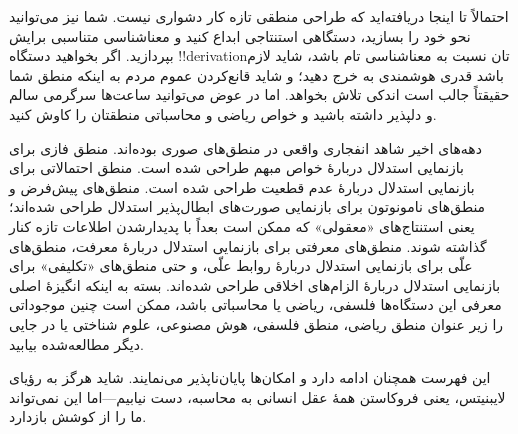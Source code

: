 \documentclass[../../../include/open-logic-section]{subfiles}
\begin{document}


احتمالاً تا اینجا دریافته‌اید که طراحی منطقی تازه کار دشواری نیست.
شما نیز می‌توانید نحو خود را بسازید، دستگاهی استنتاجی ابداع کنید و
معناشناسی متناسبی برایش بپردازید. اگر بخواهید دستگاه !!{derivation}تان
نسبت به معناشناسی تام باشد، شاید لازم باشد قدری هوشمندی به خرج دهید؛ و
شاید قانع‌کردن عموم مردم به اینکه منطق شما حقیقتاً جالب است اندکی تلاش
بخواهد. اما در عوض می‌توانید ساعت‌ها سرگرمی سالم و دلپذیر داشته باشید
و خواص ریاضی و محاسباتی منطقتان را کاوش کنید.

دهه‌های اخیر شاهد انفجاری واقعی در منطق‌های صوری بوده‌اند. منطق فازی
برای بازنمایی استدلال دربارهٔ خواص مبهم طراحی شده است. منطق احتمالاتی
برای بازنمایی استدلال دربارهٔ عدم قطعیت طراحی شده است. منطق‌های پیش‌فرض
و منطق‌های نامونوتون برای بازنمایی صورت‌های ابطال‌پذیر استدلال طراحی
شده‌اند؛ یعنی استنتاج‌های «معقولی» که ممکن است بعداً با پدیدارشدن
اطلاعات تازه کنار گذاشته شوند. منطق‌های معرفتی برای بازنمایی استدلال
دربارهٔ معرفت، منطق‌های علّی برای بازنمایی استدلال دربارهٔ روابط علّی،
و حتی منطق‌های «تکلیفی» برای بازنمایی استدلال دربارهٔ الزام‌های اخلاقی
طراحی شده‌اند. بسته به اینکه انگیزهٔ اصلی معرفی این دستگاه‌ها فلسفی،
ریاضی یا محاسباتی باشد، ممکن است چنین موجوداتی را زیر عنوان منطق
ریاضی، منطق فلسفی، هوش مصنوعی، علوم شناختی یا در جایی دیگر مطالعه‌شده
بیابید.

این فهرست همچنان ادامه دارد و امکان‌ها پایان‌ناپذیر می‌نمایند. شاید
هرگز به رؤیای لایبنیتس، یعنی فروکاستن همهٔ عقل انسانی به محاسبه، دست
نیابیم---اما این نمی‌تواند ما را از کوشش بازدارد.
\end{document}
